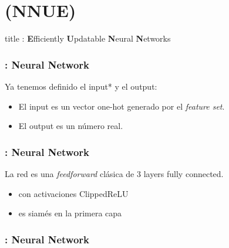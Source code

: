 
\section{ (NNUE)}

\begin{frame}
\vfill
\centering
\begin{beamercolorbox}[sep=8pt,center,shadow=false,rounded=false]{title}
    : \textbf{E}fficiently \textbf{U}pdatable \textbf{N}eural \textbf{N}etworks
    \par%
\end{beamercolorbox}
\vfill
\end{frame}

\begin{frame}
\frametitle{: \textbf{N}eural \textbf{N}etwork}
Ya tenemos definido el input* y el output: \pause
\begin{itemize}
\item El input es un vector one-hot generado por el \textit{feature set}. \pause
\item El output es un número real.
\end{itemize}
\end{frame}


\begin{frame}
\frametitle{: \textbf{N}eural \textbf{N}etwork}
La red es una \textit{feedforward} clásica de 3 layers fully connected.
\begin{itemize}
    \item con activaciones ClippedReLU
    \item es siamés en la primera capa
\end{itemize}
\end{frame}

\begin{frame}
\frametitle{: \textbf{N}eural \textbf{N}etwork}
\begin{figure}[H]
\centering
{}
\end{figure}
\end{frame}

